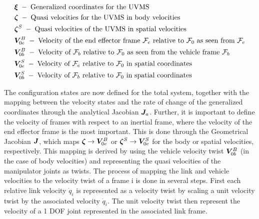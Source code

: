 \begin{mdframed}[style=graybox]
\begin{align}
	&\boldsymbol \xi \; - \; \text{Generalized coordinates for the UVMS} \nonumber
	\\
	& \boldsymbol \zeta \; - \; \text{Quasi velocities for the UVMS in body velocities} \nonumber
	\\
	& \boldsymbol \zeta^{S} \; - \; \text{Quasi velocities of the UVMS in spatial velocities} \nonumber
	\\
&	\boldsymbol V_{0e}^B\; - \; \text{Velocity of the end effector frame \ensuremath{\mathcal{F}_{e}} relative to \ensuremath{\mathcal{F}_{0}} as seen from \ensuremath{\mathcal{F}_{e}}} \nonumber
\\
& \boldsymbol V_{0b}^B\; - \; \text{Velocity of \ensuremath{\mathcal{F}_{b}} relative to \ensuremath{\mathcal{F}_{0}} as seen from the vehicle frame \ensuremath{\mathcal{F}_{b}}} \nonumber
\\
&	\boldsymbol V_{0e}^S\; - \; \text{Velocity of \ensuremath{\mathcal{F}_{e}} relative to \ensuremath{\mathcal{F}_{0}} in spatial coordinates} \nonumber
\\
&	\boldsymbol V_{0b}^S\; - \; \text{Velocity of \ensuremath{\mathcal{F}_{b}} relative to \ensuremath{\mathcal{F}_{0}} in spatial coordinates} \nonumber
\end{align}

\end{mdframed}
The configuration states are now defined for the total system, together with the mapping between the velocity states and the rate of change of the generalized coordinates through the analytical Jacobian $\boldsymbol J_{a}$. Further, it is 
important to define the velocity of frames with respect to an inertial frame, where the velocity of the end effector frame  is the most important. This is done through the Geometrical Jacobian $\boldsymbol J$, which maps $\boldsymbol \zeta \rightarrow \boldsymbol V_{0e}^B$ or $\boldsymbol \zeta^{S} \rightarrow \boldsymbol V_{0e}^S$  for the body or spatial velocities, respectively. This mapping is derived by using the vehicle velocity twist $\boldsymbol V_{0b}^B$ (in the case of body velocities) and representing the quasi velocities of the manipulator joints as twists. The process of mapping the link and vehicle velocities to the velocity twist of a frame \frame i is done in several steps. First each relative link velocity $\dot{ q}_{i}$
is represented as a velocity twist by scaling a unit velocity twist by the associated velocity $\dot{q}_{i}$. The unit velocity twist then represent the velocity of a 1 DOF joint represented in the associated link frame. 

